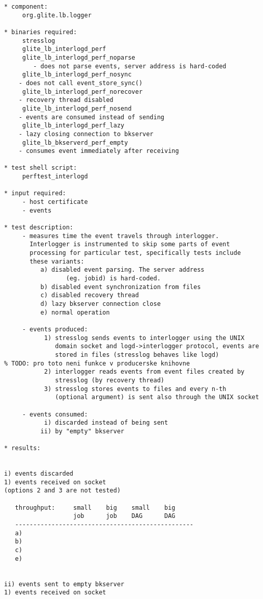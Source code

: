 \begin{verbatim}
* component:
     org.glite.lb.logger

* binaries required:
     stresslog
     glite_lb_interlogd_perf
     glite_lb_interlogd_perf_noparse
        - does not parse events, server address is hard-coded
     glite_lb_interlogd_perf_nosync
	- does not call event_store_sync()
     glite_lb_interlogd_perf_norecover
	- recovery thread disabled
     glite_lb_interlogd_perf_nosend
	- events are consumed instead of sending
     glite_lb_interlogd_perf_lazy
	- lazy closing connection to bkserver
     glite_lb_bkserverd_perf_empty
	- consumes event immediately after receiving

* test shell script:
     perftest_interlogd

* input required:
     - host certificate
     - events

* test description:
     - measures time the event travels through interlogger.
       Interlogger is instrumented to skip some parts of event
       processing for particular test, specifically tests include
       these variants:
	      a) disabled event parsing. The server address
                 (eg. jobid) is hard-coded.
	      b) disabled event synchronization from files
	      c) disabled recovery thread
	      d) lazy bkserver connection close
	      e) normal operation

     - events produced:
           1) stresslog sends events to interlogger using the UNIX
              domain socket and logd->interlogger protocol, events are
              stored in files (stresslog behaves like logd)
% TODO: pro toto neni funkce v producerske knihovne
           2) interlogger reads events from event files created by
              stresslog (by recovery thread)
           3) stresslog stores events to files and every n-th
              (optional argument) is sent also through the UNIX socket

     - events consumed:
           i) discarded instead of being sent
          ii) by "empty" bkserver

* results:


i) events discarded
1) events received on socket
(options 2 and 3 are not tested)

   throughput:     small    big    small    big
                   job      job    DAG      DAG
   -------------------------------------------------
   a)
   b)
   c)
   e)


ii) events sent to empty bkserver
1) events received on socket


\end{verbatim}
